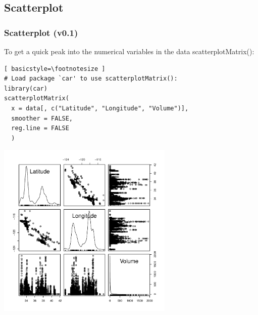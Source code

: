\subsection{Scatterplot}
\begin{frame}
\frametitle{Scatterplot (v0.1)}

To get a quick peak into the numerical variables in the data \ttfamily scatterplotMatrix(): \normalfont
  		\begin{lstlisting}[ basicstyle=\footnotesize ]
# Load package `car' to use scatterplotMatrix():	
library(car)	
scatterplotMatrix(
  x = data[, c("Latitude", "Longitude", "Volume")], 
  smoother = FALSE, 
  reg.line = FALSE
  )
		\end{lstlisting}

        \begin{center}
         \includegraphics[width=0.63\textwidth]{images/scatterPlot_v0.pdf}
        \end{center}
\end{frame}

